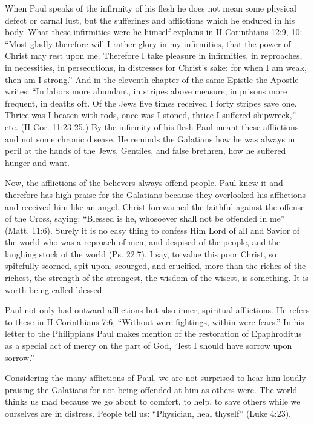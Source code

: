 When Paul speaks of the infirmity of his flesh he does not mean some physical defect or carnal lust, but the sufferings and afflictions which he endured in his body. What these infirmities were he himself explains in II Corinthians 12:9, 10: “Most gladly therefore will I rather glory in my infirmities, that the power of Christ may rest upon me. Therefore I take pleasure in infirmities, in reproaches, in necessities, in persecutions, in distresses for Christ’s sake: for when I am weak, then am I strong.” And in the eleventh chapter of the same Epistle the Apostle writes: “In labors more abundant, in stripes above measure, in prisons more frequent, in deaths oft. Of the Jews five times received I forty stripes save one. Thrice was I beaten with rods, once was I stoned, thrice I suffered shipwreck,” etc. (II Cor. 11:23-25.) By the infirmity of his flesh Paul meant these afflictions and not some chronic disease. He reminds the Galatians how he was always in peril at the hands of the Jews, Gentiles, and false brethren, how he suffered hunger and want.

Now, the afflictions of the believers always offend people. Paul knew it and therefore has high praise for the Galatians because they overlooked his afflictions and received him like an angel. Christ forewarned the faithful against the offense of the Cross, saying: “Blessed is he, whosoever shall not be offended in me” (Matt. 11:6). Surely it is no easy thing to confess Him Lord of all and Savior of the world who was a reproach of men, and despised of the people, and the laughing stock of the world (Ps. 22:7). I say, to value this poor Christ, so spitefully scorned, spit upon, scourged, and crucified, more than the riches of the richest, the strength of the strongest, the wisdom of the wisest, is something. It is worth being called blessed.

Paul not only had outward afflictions but also inner, spiritual afflictions. He refers to these in II Corinthians 7:6, “Without were fightings, within were fears.” In his letter to the Philippians Paul makes mention of the restoration of Epaphroditus as a special act of mercy on the part of God, “lest I should have sorrow upon sorrow.”

Considering the many afflictions of Paul, we are not surprised to hear him loudly praising the Galatians for not being offended at him as others were. The world thinks us mad because we go about to comfort, to help, to save others while we ourselves are in distress. People tell us: “Physician, heal thyself” (Luke 4:23).

